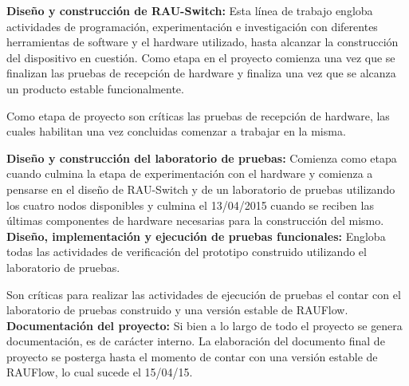 \textbf{Diseño y construcci\'on de RAU-Switch:} Esta l\'inea de trabajo engloba actividades de programaci\'on, experimentaci\'on e investigaci\'on con diferentes herramientas de software y el hardware utilizado, hasta alcanzar la construcci\'on del dispositivo en cuesti\'on. Como etapa en el proyecto comienza una vez que se finalizan las pruebas de recepci\'on de hardware y finaliza una vez que se alcanza un producto estable funcionalmente.

Como etapa de proyecto son cr\'iticas las pruebas de recepci\'on de hardware, las cuales habilitan una vez concluidas comenzar a trabajar en la misma.

\textbf{Diseño y construcci\'on del laboratorio de pruebas:} Comienza como etapa cuando culmina la etapa de experimentaci\'on con el hardware y comienza a pensarse en el diseño de RAU-Switch y de un laboratorio de pruebas utilizando los cuatro nodos disponibles y culmina el 13/04/2015 cuando se reciben las \'ultimas componentes de hardware necesarias para la construcci\'on del mismo.\\

\textbf{Diseño, implementaci\'on y ejecuci\'on de pruebas funcionales:} Engloba todas las actividades de verificaci\'on del prototipo construido utilizando el laboratorio de pruebas.

Son cr\'iticas para realizar las actividades de ejecuci\'on de pruebas el contar con el laboratorio de pruebas construido y una versi\'on estable de RAUFlow.\\

\textbf{Documentaci\'on del proyecto:} Si bien a lo largo de todo el proyecto se genera documentaci\'on, es de carácter interno. La elaboraci\'on del documento final de proyecto se posterga hasta el momento de contar con una versi\'on estable de RAUFlow, lo cual sucede el 15/04/15.\\